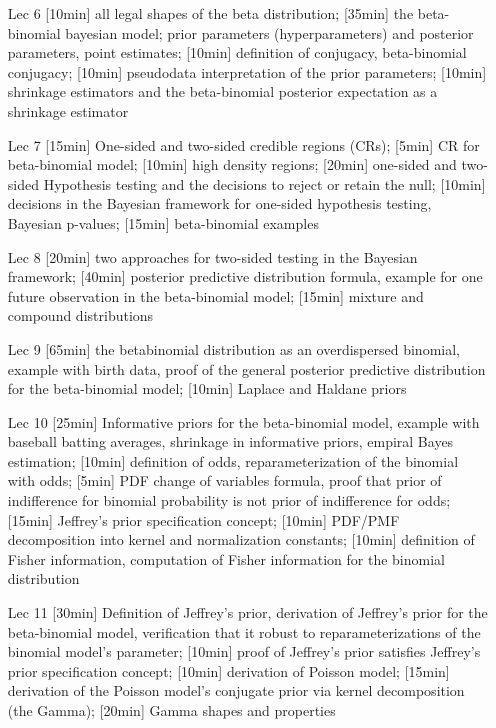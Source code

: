 \begin{enumerate}
\item[Lec 6] [10min] all legal shapes of the beta distribution; [35min] the beta-binomial bayesian model; prior parameters (hyperparameters) and posterior parameters, point estimates; [10min] definition of conjugacy, beta-binomial conjugacy; [10min] pseudodata interpretation of the prior parameters; [10min] shrinkage estimators and the beta-binomial posterior expectation as a shrinkage estimator

\item[Lec 7] [15min] One-sided and two-sided credible regions (CRs); [5min] CR for beta-binomial model; [10min] high density regions; [20min] one-sided and two-sided Hypothesis testing and the decisions to reject or retain the null; [10min] decisions in the Bayesian framework for one-sided hypothesis testing, Bayesian p-values; [15min] beta-binomial examples


\item[Lec 8] [20min] two approaches for two-sided testing in the Bayesian framework; [40min] posterior predictive distribution formula, example for one future observation in the beta-binomial model; [15min] mixture and compound distributions

\item[Lec 9] [65min] the betabinomial distribution as an overdispersed binomial, example with birth data, proof of the general posterior predictive distribution for the beta-binomial model; [10min] Laplace and Haldane priors


\item[Lec 10] [25min] Informative priors for the beta-binomial model, example with baseball batting averages, shrinkage in informative priors, empiral Bayes estimation; [10min] definition of odds, reparameterization of the binomial with odds; [5min] PDF change of variables formula, proof that prior of indifference for binomial probability is not prior of indifference for odds; [15min] Jeffrey's prior specification concept; [10min] PDF/PMF decomposition into kernel and normalization constants; [10min] definition of Fisher information, computation of Fisher information for the binomial distribution

\item[Lec 11] [30min] Definition of Jeffrey's prior, derivation of Jeffrey's prior for the beta-binomial model, verification that it robust to reparameterizations of the binomial model's parameter; [10min] proof of Jeffrey's prior satisfies  Jeffrey's prior specification concept; [10min] derivation of Poisson model; [15min] derivation of the Poisson model's conjugate prior via kernel decomposition (the Gamma); [20min] Gamma shapes and properties


\end{enumerate}
